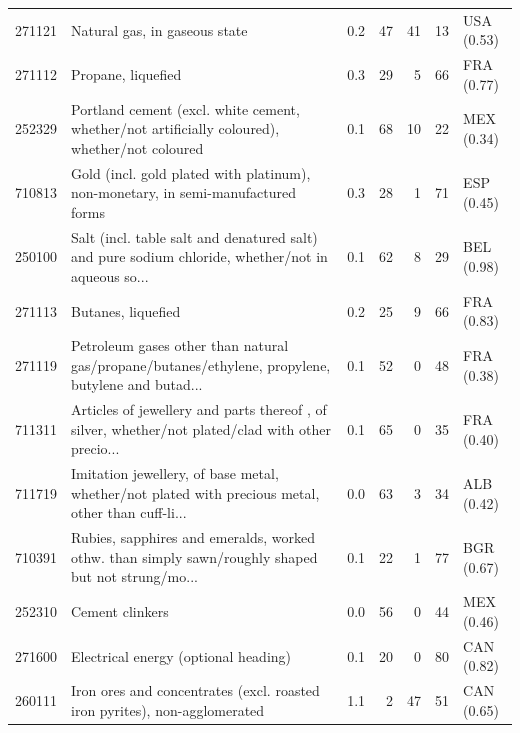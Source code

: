 \begin{tabular}{@{}l p{6.4cm} r r r r l@{}}
271121 & Natural gas, in gaseous state & 0.2 & 47 & 41 & 13 & USA (0.53) \\
271112 & Propane, liquefied & 0.3 & 29 & 5 & 66 & FRA (0.77) \\
252329 & Portland cement (excl. white cement, whether/\allowbreak{}not artificially coloured), whether/\allowbreak{}not coloured & 0.1 & 68 & 10 & 22 & MEX (0.34) \\
710813 & Gold (incl. gold plated with platinum), non-monetary, in semi-manufactured forms & 0.3 & 28 & 1 & 71 & ESP (0.45) \\
250100 & Salt (incl. table salt and denatured salt) and pure sodium chloride, whether/\allowbreak{}not in aqueous so... & 0.1 & 62 & 8 & 29 & BEL (0.98) \\
271113 & Butanes, liquefied & 0.2 & 25 & 9 & 66 & FRA (0.83) \\
271119 & Petroleum gases other than natural gas/\allowbreak{}propane/\allowbreak{}butanes/\allowbreak{}ethylene, propylene, butylene and butad... & 0.1 & 52 & 0 & 48 & FRA (0.38) \\
711311 & Articles of jewellery and parts thereof , of silver, whether/\allowbreak{}not plated/\allowbreak{}clad with other precio... & 0.1 & 65 & 0 & 35 & FRA (0.40) \\
711719 & Imitation jewellery, of base metal, whether/\allowbreak{}not plated with precious metal, other than cuff-li... & 0.0 & 63 & 3 & 34 & ALB (0.42) \\
710391 & Rubies, sapphires and emeralds, worked othw. than simply sawn/\allowbreak{}roughly shaped but not strung/\allowbreak{}mo... & 0.1 & 22 & 1 & 77 & BGR (0.67) \\
252310 & Cement clinkers & 0.0 & 56 & 0 & 44 & MEX (0.46) \\
271600 & Electrical energy (optional heading) & 0.1 & 20 & 0 & 80 & CAN (0.82) \\
260111 & Iron ores and concentrates (excl. roasted iron pyrites), non-agglomerated & 1.1 & 2 & 47 & 51 & CAN (0.65) \\
\bottomrule
\end{tabular}
